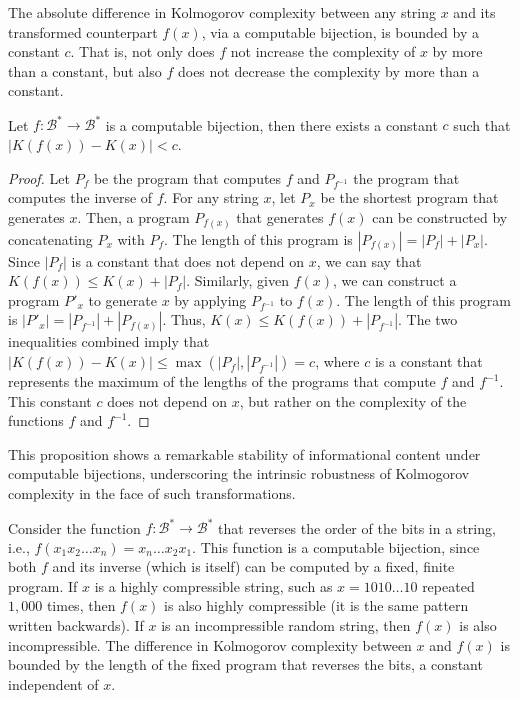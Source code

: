 The absolute difference in Kolmogorov complexity between any string \(x\) and its transformed counterpart \(f(x)\), via a computable bijection, is bounded by a constant $c$. That is, not only does $f$ not increase the complexity of $x$ by more than a constant, but also $f$ does not decrease the complexity by more than a constant.

\begin{proposition}
Let $f:\mathcal{B}^{\ast} \to \mathcal{B}^{\ast}$ is a computable bijection, then there exists a constant $c$ such that $| K\left( f(x) \right) -  K(x) | < c$.
\end{proposition}
\begin{proof}
Let $P_f$ be the program that computes $f$ and $P_{f^{-1}}$ the program that computes the inverse of $f$. For any string $x$, let $P_x$ be the shortest program that generates $x$. Then, a program $P_{f(x)}$ that generates $f(x)$ can be constructed by concatenating $P_x$ with $P_f$. The length of this program is $|P_{f(x)}| = |P_f| + |P_x|$. Since $|P_f|$ is a constant that does not depend on $x$, we can say that $K(f(x)) \leq K(x) + |P_f|$. Similarly, given $f(x)$, we can construct a program $P'_{x}$ to generate $x$ by applying $P_{f^{-1}}$ to $f(x)$. The length of this program is $|P'_{x}| = |P_{f^{-1}}| + |P_{f(x)}|$. Thus, $K(x) \leq K(f(x)) + |P_{f^{-1}}|$. The two inequalities combined imply that $|K(f(x)) - K(x)| \leq \max(|P_f|, |P_{f^{-1}}|) = c$, where \(c\) is a constant that represents the maximum of the lengths of the programs that compute \(f\) and \(f^{-1}\). This constant \(c\) does not depend on \(x\), but rather on the complexity of the functions \(f\) and \(f^{-1}\).
\end{proof}

This proposition shows a remarkable stability of informational content under computable bijections, underscoring the intrinsic robustness of Kolmogorov complexity in the face of such transformations.

\begin{example}
Consider the function $f:\mathcal{B}^\ast \to \mathcal{B}^\ast$ that reverses the order of the bits in a string, i.e., $f(x_1x_2\ldots x_n) = x_n\ldots x_2x_1$. This function is a computable bijection, since both $f$ and its inverse (which is itself) can be computed by a fixed, finite program. If $x$ is a highly compressible string, such as $x = 1010\ldots10$ repeated $1{,}000$ times, then $f(x)$ is also highly compressible (it is the same pattern written backwards). If $x$ is an incompressible random string, then $f(x)$ is also incompressible. The difference in Kolmogorov complexity between $x$ and $f(x)$ is bounded by the length of the fixed program that reverses the bits, a constant independent of $x$.
\end{example}

